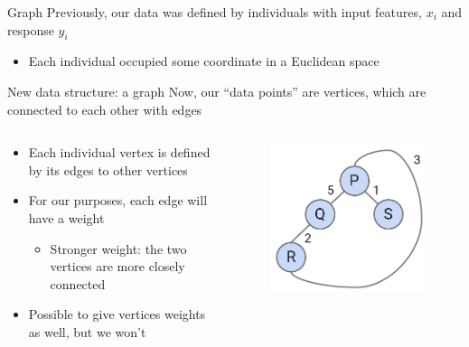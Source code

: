 \documentclass[aspectratio=169]{../latex_main/tntbeamer}  %
\begin{document}
	
	\begin{frame}{Graph}
	    Previously, our data was defined by individuals with input features,   $x_i$    and response $y_i$
	    \begin{itemize}
	        \item Each individual occupied some coordinate in a Euclidean space
	    \end{itemize}
	    \bigskip
	    New data structure: a graph
        Now, our “data points” are vertices, which are connected to each other with edges
        \begin{columns}
            \begin{column}{.5\textwidth}
                    \begin{itemize}
                        \item Each individual vertex is defined by its edges to other vertices
                        \item For our purposes, each edge will have a weight
                        \begin{itemize}
                            \item Stronger weight: the two vertices are more closely connected
                        \end{itemize}
                        \item Possible to give vertices weights as well, but we won’t
                    \end{itemize}
            \end{column}
            
            
            \begin{column}{.5\textwidth}
                    \begin{figure}
                        \centering
                        \includegraphics[scale=.4]{Bild4}
                    \end{figure}
            \end{column}
        \end{columns}
	\end{frame}
	
\end{document}
